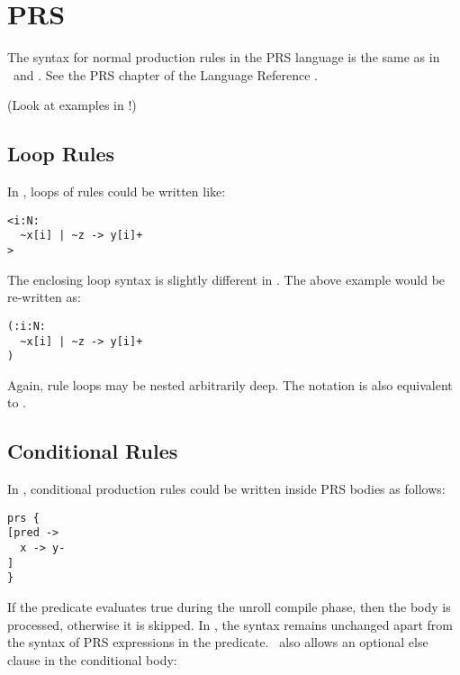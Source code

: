 
\section{PRS}
\label{sec:prs}

The syntax for normal production rules in the PRS language 
is the same as in \CAST\ and \hac.
See the PRS chapter of the Language Reference .

(Look at examples in !)

\subsection{Loop Rules}
\label{sec:prs:looprules}

In \CAST, loops of rules could be written like:

\begin{verbatim}
<i:N:
  ~x[i] | ~z -> y[i]+
>
\end{verbatim}

The enclosing loop syntax is slightly different in \hac.
The above example would be re-written as:

\begin{verbatim}
(:i:N:
  ~x[i] | ~z -> y[i]+
)
\end{verbatim}

Again, rule loops may be nested arbitrarily deep.  
The notation  is also equivalent to .  

\subsection{Conditional Rules}
\label{sec:prs:conditional}

In \CAST, conditional production rules could be written inside
PRS bodies as follows:

\begin{verbatim}
prs {
[pred ->
  x -> y-
]
}
\end{verbatim}

If the predicate  evaluates true during the unroll compile phase, 
then the body is processed, otherwise it is skipped.  
In \hac, the syntax remains unchanged apart from the syntax of
PRS expressions in the predicate.  
\hac\ also allows an optional else clause in the conditional body:

